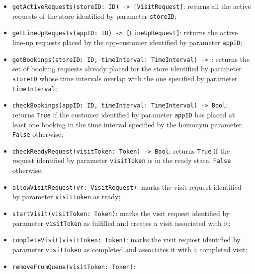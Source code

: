 \documentclass[a4paper,oneside,11pt]{book}
\newcommand{\red}[1]{\begingroup\color{punct}#1\endgroup}
\begin{document}
\begin{itemize}
       \item \texttt{getActiveRequests(storeID: \red{ID}) -> [\red{VisitRequest}]}: \newline
       returns all the active requests of the store identified by parameter \texttt{storeID};
       \item \texttt{getLineUpRequests(appID: \red{ID}) -> [\red{LineUpRequest}]}: \newline
       returns the active line-up requests placed by the app-customer identified by parameter \texttt{appID};
       \item \texttt{getBookings(storeID: \red{ID}, timeInterval: \red{TimeInterval}) -> \newline [\red{BookingRequest}]}: \newline
       returns the set of booking requests already placed for the store identified by parameter \texttt{storeID} whose time intervals overlap with the one specified by parameter \texttt{timeInterval};
       \item \texttt{checkBookings(appID: \red{ID}, timeInterval: \red{TimeInterval}) -> \red{Bool}}: \newline
       returns \texttt{True} if the customer identified by parameter \texttt{appID} has placed at least one booking in the time interval specified by the homonym parameter. \texttt{False} otherwise;
       \item \texttt{checkReadyRequest(visitToken: \red{Token}) -> \red{Bool}}: \newline
       returns \texttt{True} if the request identified by parameter \texttt{visitToken} is in the ready state. \texttt{False} otherwise;
       \item \texttt{allowVisitRequest(vr: \red{VisitRequest})}: \newline
       marks the visit request identified by parameter \texttt{visitToken} as ready;
       \item \texttt{startVisit(visitToken: \red{Token})}: \newline
       marks the visit request identified by parameter \texttt{visitToken} as fulfilled and creates a visit associated with it;
       \item \texttt{completeVisit(visitToken: \red{Token})}: \newline
       marks the visit request identified by parameter \texttt{visitToken} as completed and associates it with a completed visit;
       \item \texttt{removeFromQueue(visitToken: \red{Token})}: \newline

\end{itemize}
\end{document}

